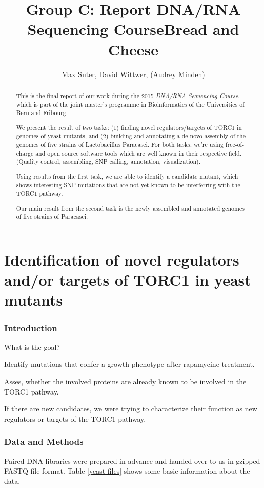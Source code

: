 \documentclass[]{article}
\title{Group C: Report DNA/RNA Sequencing Course\newline Bread and Cheese}
\author{Max Suter, David Wittwer, (Audrey Minden)}
\begin{document}
\maketitle

\begin{abstract}
This is the final report of our work during the 2015 \emph{DNA/RNA Sequencing Course}, which is part of the joint master's programme in Bioinformatics of the Universities of Bern and Fribourg.

We present the result of two tasks: (1) finding novel regulators/targets of TORC1 in genomes of yeast mutants, and  (2) building and annotating a de-novo assembly of the genomes of five strains of Lactobacillus Paracasei. For both tasks, we're using free-of-charge and open source software tools which are well known in their respective field. (Quality control, assembling, SNP calling, annotation, visualization).

Using results from the first task, we are able to identify a candidate mutant, which shows interesting SNP mutations that are not yet known to be interferring with the TORC1 pathway.


Our main result from the second task is the newly assembled and annotated genomes of five strains of Paracasei.


\end{abstract}


\pagebreak
\part{Identification of novel regulators and/or targets of TORC1 in yeast mutants}

\section{Introduction}
What is the goal?

Identify mutations that confer a growth phenotype after rapamycine treatment.

Asses, whether the involved proteins are already known to be involved in the TORC1 pathway.

If there are new candidates, we were trying to characterize their function as new regulators or targets of the TORC1 pathway.

\section{Data and Methods}
Paired DNA libraries were prepared in advance and handed over to us in gzipped FASTQ file format. Table \ref{yeast-files} shows some basic information about the data.
\end{document}
